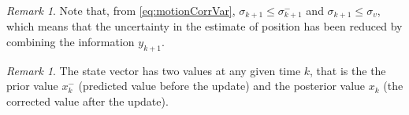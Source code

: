 \documentclass{article}
\theoremstyle{definition}
\theoremstyle{remark}
\newtheorem{remark}[thm]{Remark}
\begin{document}
\begin{remark}
Note that, from \eqref{eq:motionCorrVar}, $\sigma_{k+1} \leq \sigma^-_{k+1}$ and $\sigma_{k+1} \leq \sigma_v$, which means that the uncertainty in the estimate of position has been reduced by combining the information $y_{k+1}$.
\end{remark}

\begin{remark}
The state vector has two values at any given time $k$, that is the the prior value $x_k^-$ (predicted value before the update) and the posterior value $x_k$ (the corrected value after the update).
\end{remark}
\end{document}
